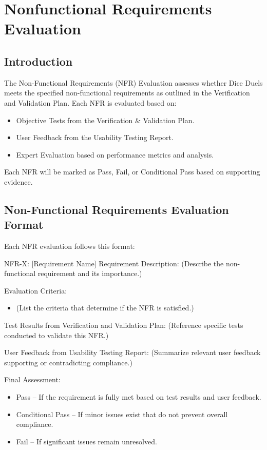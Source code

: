 \documentclass[12pt, titlepage]{article}
\begin{document}
\newpage
\section{Nonfunctional Requirements Evaluation}

\subsection{Introduction}

The Non-Functional Requirements (NFR) Evaluation assesses whether Dice Duels meets the specified non-functional requirements as outlined in the Verification and Validation Plan. Each NFR is evaluated based on:
\begin{itemize}
	\item Objective Tests from the Verification \& Validation Plan.
	\item User Feedback from the Usability Testing Report.
	\item Expert Evaluation based on performance metrics and analysis.
\end{itemize}
Each NFR will be marked as Pass, Fail, or Conditional Pass based on supporting evidence.

\subsection{Non-Functional Requirements Evaluation Format}

Each NFR evaluation follows this format:

NFR-X: [Requirement Name]
Requirement Description:
(Describe the non-functional requirement and its importance.)

Evaluation Criteria:
\begin{itemize}
    \item (List the criteria that determine if the NFR is satisfied.)
\end{itemize}
Test Results from Verification and Validation Plan:
(Reference specific tests conducted to validate this NFR.)

User Feedback from Usability Testing Report:
(Summarize relevant user feedback supporting or contradicting compliance.)

Final Assessment:
\begin{itemize}
    \item Pass – If the requirement is fully met based on test results and user feedback.
    \item Conditional Pass – If minor issues exist that do not prevent overall compliance.
    \item Fail – If significant issues remain unresolved.
\end{itemize}
\end{document}
